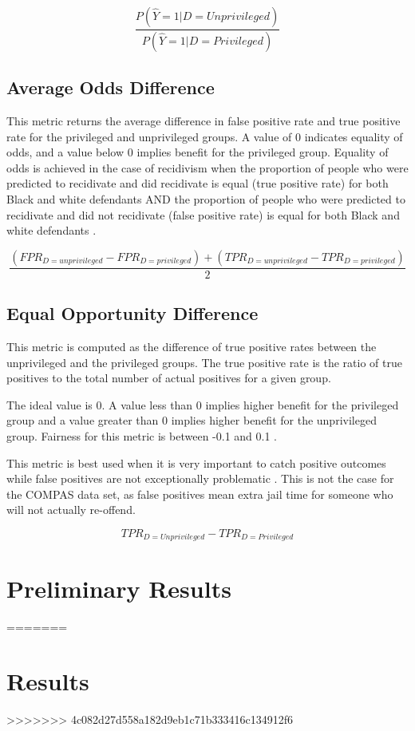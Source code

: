 \documentclass[water,article,submit,moreauthors,pdftex]{mdpi}
\begin{document}
\[\frac{P(\hat{Y}=1|D=Unprivileged)}{P(\hat{Y}=1|D=Privileged)}\]

\hypertarget{average-odds-difference}{%
\subsection{Average Odds Difference}\label{average-odds-difference}}

This metric returns the average difference in false positive rate and
true positive rate for the privileged and unprivileged groups. A value
of 0 indicates equality of odds, and a value below 0 implies benefit for
the privileged group. Equality of odds is achieved in the case of
recidivism when the proportion of people who were predicted to
recidivate and did recidivate is equal (true positive rate) for both
Black and white defendants AND the proportion of people who were
predicted to recidivate and did not recidivate (false positive rate) is
equal for both Black and white defendants \citep{aif360-oct-2018}.

\[\frac{(FPR_{D = unprivileged} - FPR_{D = privileged}) + (TPR_{D = unprivileged} - TPR_{D = privileged})}{2}\]

\hypertarget{equal-opportunity-difference}{%
\subsection{Equal Opportunity
Difference}\label{equal-opportunity-difference}}

This metric is computed as the difference of true positive rates between
the unprivileged and the privileged groups. The true positive rate is
the ratio of true positives to the total number of actual positives for
a given group\citep{GoogleDev}.

The ideal value is 0. A value less than 0 implies higher benefit for the
privileged group and a value greater than 0 implies higher benefit for
the unprivileged group. Fairness for this metric is between -0.1 and 0.1
\citep{aif360-oct-2018}.

This metric is best used when it is very important to catch positive
outcomes while false positives are not exceptionally problematic
\citep{Cortez2019How}. This is not the case for the COMPAS data set, as
false positives mean extra jail time for someone who will not actually
re-offend.

\[TPR_{D = Unprivileged} - TPR_{D = Privileged}\]

\hypertarget{preliminary-results}{%
\section{Preliminary Results}\label{preliminary-results}}
=======
\hypertarget{results}{%
\section{Results}\label{results}}
>>>>>>> 4c082d27d558a182d9eb1c71b333416c134912f6
\end{document}

